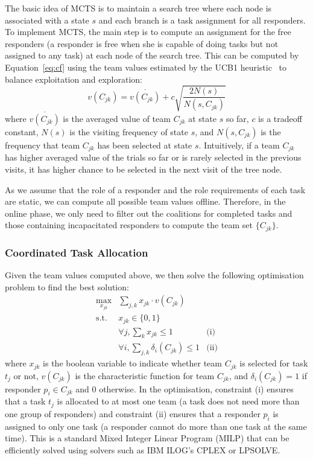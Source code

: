 The basic idea of MCTS is to maintain a search tree where each node
is associated with a state $s$ and each branch is a task assignment
for all responders. To implement MCTS, the main step is to compute
an assignment for the free responders (a responder is free when she
is capable of doing tasks but not assigned to any task) at each
node of the search tree. This can be computed by
Equation~\ref{eq:cf} using the team values estimated by the UCB1
heuristic~\cite{auer2002finite} to balance exploitation and
exploration:
\begin{equation}
  v(C_{jk}) = \overline{v(C_{jk})} + c\sqrt{\frac{2N(s)}{N(s, C_{jk})}}
\end{equation}
where $\overline{v(C_{jk})}$ is the averaged value of team $C_{jk}$
at state $s$ so far, $c$ is a tradeoff constant, $N(s)$ is the
visiting frequency of state $s$, and $N(s, C_{jk})$ is the
frequency that team $C_{jk}$ has been selected at state $s$.
Intuitively, if a team $C_{jk}$ has higher averaged value of the
trials so far or is rarely selected in the previous visits, it has
higher chance to be selected in the next visit of the tree node.

As we assume that the role of a responder and the role requirements
of each task are static, we can compute all possible team values
offline. Therefore, in the online phase, we only need to filter out
the coalitions for completed tasks and those containing
incapacitated responders to compute the team set $\{ C_{jk} \}$.

\subsubsection{Coordinated Task Allocation}
\noindent Given the team values computed above, we then solve the
following optimisation problem to find the best solution:
\begin{equation}
  \begin{array}{lll}
    \max\limits_{x_{jk}} & \sum_{j, k} x_{jk} \cdot v(C_{jk}) & \\[2pt]
    \mbox{s.t.} & x_{jk} \in \{0, 1\} & \\[2pt]
    & \forall j, \sum_{k} x_{jk} \leq 1 & \mbox{(i)} \\[2pt]
    & \forall i, \sum_{j, k} \delta_i(C_{jk}) \leq 1 & \mbox{(ii)}
  \end{array}
  \label{eq:cf}
\end{equation}
where $x_{jk}$ is the boolean variable to indicate whether team
$C_{jk}$ is selected for task $t_j$ or not, $v(C_{jk})$ is the
characteristic function for team $C_{jk}$, and $\delta_i(C_{jk}) =
1$ if responder $p_i\in C_{jk}$ and 0 otherwise. In the
optimisation, constraint (i) ensures that a task $t_j$ is allocated
to at most one team (a task does not need more than one group of
responders) and constraint (ii) ensures that a responder $p_i$ is
assigned to only one task (a responder cannot do more than one task
at the same time). This is a standard Mixed Integer Linear Program
(MILP) that can be efficiently solved  using solvers such as IBM
ILOG's CPLEX or LPSOLVE.

